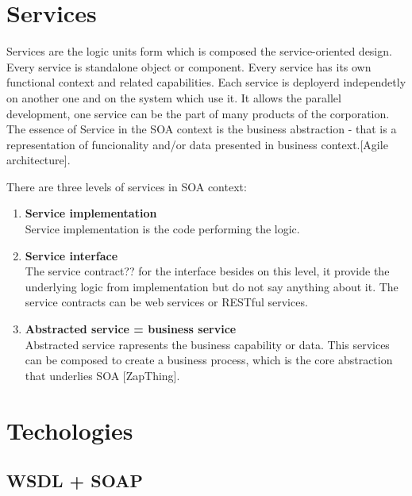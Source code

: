 \section{Services}
Services are the logic units form which is composed the service-oriented design. Every service is standalone object or component. Every service has its own functional context and related capabilities. Each service is deployerd independetly on another one and on the system which use it. It allows the parallel development, one service can be the part of many products of the corporation.
The essence of Service in the SOA context is the business abstraction - that is a representation of funcionality and/or data presented in business context.[Agile architecture].

There are three levels of services in SOA context:
\begin{enumerate}
  \item \textbf{Service implementation} \hfill \\
Service implementation is the code performing the logic.
  \item \textbf{Service interface} \hfill \\ 
The service contract?? for the interface besides on this level, it provide the underlying logic from implementation but do not say anything about it. The service contracts can be web services or RESTful services.
  \item \textbf{Abstracted service = business service} \hfill \\
Abstracted service rapresents the business capability or data. This services can be composed to create a business process, which is the core abstraction that underlies SOA [ZapThing].
\end{enumerate}





\section{Techologies}

\subsection{WSDL + SOAP}
